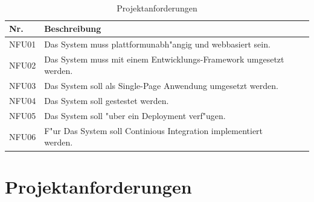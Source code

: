 \documentclass[a4paper, 11pt]{scrreprt}
\begin{document}
\begin{table}[H]

\caption{Projektanforderungen}

\ \\

\par

\label{tab:Tabelle2}

\centering

\begin{tabular}{|p{2.5cm} p{12cm}| ll}

\hline
Nr.	& Beschreibung\\

\hline
NFU01 &	Das System muss plattformunabh"angig und webbasiert sein. \\

\hline
NFU02 &	Das System muss mit einem Entwicklungs-Framework umgesetzt werden.\\

\hline
NFU03 &	Das System soll als Single-Page Anwendung umgesetzt werden.\\

\hline
NFU04 &	Das System soll gestestet werden.\\

\hline
NFU05 &	Das System soll "uber ein Deployment verf"ugen.\\

\hline
NFU06 &	F"ur Das System soll Continious Integration implementiert werden.\\

\end{tabular}

\end{table}

\section{Projektanforderungen}
\end{document}
